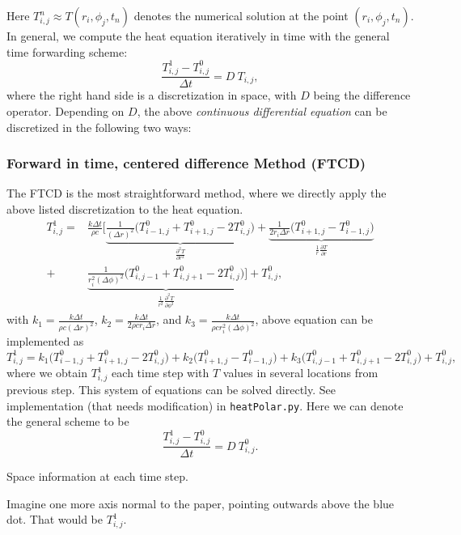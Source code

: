 \documentclass[12pt]{article}
\newcommand{\stencilpt}[4][]{\node[circle,fill,draw,inner sep=1.5pt,label={above left:#4},#1] at (#2) (#3) {}}
\begin{document}
Here $T^n_{i,j} \approx T(r_i,\phi_j,t_n)$ denotes the numerical solution at the point $(r_i,\phi_j,t_n)$. In general, we compute the heat equation iteratively in time with the general time forwarding scheme: 
\begin{equation}
\frac{T^1_{i,j}-T^0_{i,j}}{\Delta t}=D\ T_{i,j},
\end{equation}
where the right hand side is a discretization in space, with $D$ being the difference operator. Depending on $D$, the above {\it continuous differential equation} can be discretized in the following two ways:
\subsubsection{Forward in time, centered difference Method (FTCD)}
The FTCD is the most straightforward method, where we directly apply the above listed discretization to the heat equation. 
\begin{align}
T^1_{i,j}=& \frac{k\Delta t}{\rho c}\bigg[\underbrace{\frac{1}{(\Delta r)^2}\bigg(T^0_{i-1,j}+T^0_{i+1,j}-2T^0_{i,j}\bigg)}_{\frac{\partial^2T}{\partial r^2}}+\underbrace{\frac{1}{2r_i\Delta r}\bigg(T^0_{i+1,j}-T^0_{i-1,j}\bigg)}_{\frac{1}{r}\frac{\partial T}{\partial r}}\nonumber\\
+& \underbrace{\frac{1}{r_i^2(\Delta \phi)^2}\bigg(T^0_{i,j-1}+T^0_{i,j+1}-2T^0_{i,j}\bigg)}_{\frac{1}{r^2}\frac{\partial^2 T}{\partial \phi^2}}\bigg]+T^0_{i,j},
\end{align}
with $k_1= \frac{k\Delta t}{\rho c(\Delta r)^2}$, $k_2 = \frac{k\Delta t}{2\rho cr_i\Delta r}$, and $k_3= \frac{k\Delta t}{\rho cr_i^2(\Delta \phi)^2}$, above equation can be implemented as
\begin{equation}
T^1_{i,j}= k_1\bigg(T^0_{i-1,j}+T^0_{i+1,j}-2T^0_{i,j}\bigg)+k_2\bigg(T^0_{i+1,j}-T^0_{i-1,j}\bigg)
+k_3\bigg(T^0_{i,j-1}+T^0_{i,j+1}-2T^0_{i,j}\bigg)+T^0_{i,j},
\end{equation}
where we obtain $T^1_{i,j}$ each time step with $T$ values in several locations from previous step. This system of equations can be solved directly. See implementation (that needs modification) in {\tt heatPolar.py}. Here we can denote the general scheme to be 
\begin{equation}
\frac{T^1_{i,j}-T^0_{i,j}}{\Delta t}=D\ T^0_{i,j}.
\end{equation}

\begin{center}

Space information at each time step.
\end{center}
Imagine one more axis normal to the paper, pointing outwards above the blue dot. That would be $T^1_{i,j}$. 
\end{document}

